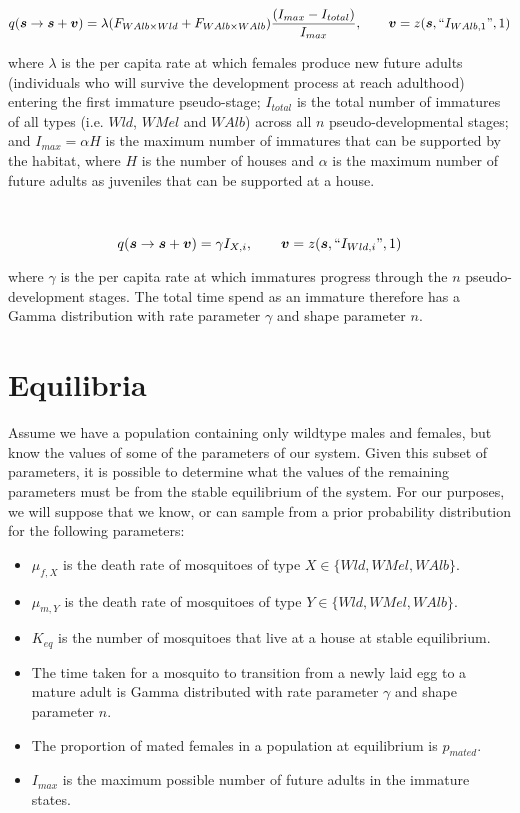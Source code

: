 \documentclass[]{article}  %
\begin{document}
$$q(\boldsymbol{s} \rightarrow \boldsymbol{s} + \boldsymbol{v}) = \lambda (F_{WAlb \times Wld} + F_{WAlb \times WAlb})\frac{(I_{max} - I_{total})}{I_{max}},  \qquad \boldsymbol{v} =  z(\boldsymbol{s}, \textup{``} I_{WAlb, 1} \textup{''} , 1)$$

\noindent where $\lambda$ is the per capita rate at which females produce new future adults (individuals who will survive the development process at reach adulthood) entering the first immature pseudo-stage; $I_{total}$ is the total number of immatures of all types (i.e. $Wld$, $WMel$ and $WAlb$) across all $n$ pseudo-developmental stages; and $I_{max} = \alpha H$ is the maximum number of immatures that can be supported by the habitat, where $H$ is the number of houses and $\alpha$ is the maximum number of future adults as juveniles that can be supported at a house.
\\
\\
\\
$$q(\boldsymbol{s} \rightarrow \boldsymbol{s} + \boldsymbol{v}) = \gamma I_{X, i},  \qquad \boldsymbol{v} =  z(\boldsymbol{s}, \textup{``} I_{Wld, i} \textup{''} , 1)$$

\noindent where $\gamma$ is the per capita rate at which immatures progress through the $n$ pseudo-development stages.  The total time spend as an immature therefore has a Gamma distribution with rate parameter $\gamma$ and shape parameter $n$.

\section{Equilibria}
Assume we have a population containing only wildtype males and females, but know the values of some of the parameters of our system.  Given this subset of parameters, it is possible to determine what the values of the remaining parameters must be from the stable equilibrium of the system.  For our purposes, we will suppose that we know, or can sample from a prior probability distribution for the following parameters:

\begin{itemize}
\item $\mu_{f, X}$ is the death rate of mosquitoes of type $X \in \{ Wld, WMel, WAlb \}$.
\item $\mu_{m, Y}$ is the death rate of mosquitoes of type $Y \in \{ Wld, WMel, WAlb \}$.
\item $K_{eq}$ is the number of mosquitoes that live at a house at stable equilibrium.
\item The time taken for a mosquito to transition from a newly laid egg to a mature adult is Gamma distributed with rate parameter $\gamma$ and shape parameter $n$.
\item The proportion of mated females in a population at equilibrium is $p_{mated}$.
\item $I_{max}$ is the maximum possible number of future adults in the immature states.
\end{itemize}
\end{document}
